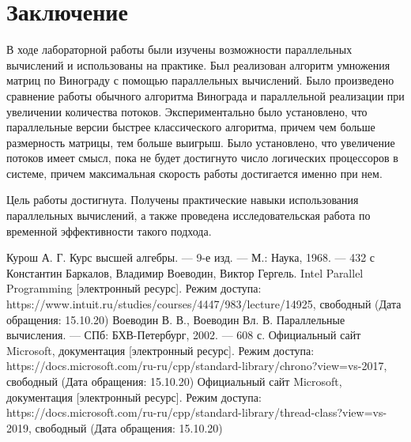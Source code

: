 \documentclass[12pt]{report}
\begin{document}
\chapter*{Заключение}
\hspace{0.6cm}В ходе лабораторной работы были изучены возможности параллельных вычислений и использованы на практике. Был реализован алгоритм умножения матриц по Винограду с помощью параллельных вычислений.
Было произведено сравнение работы обычного алгоритма Винограда и параллельной реализации при увеличении количества потоков. Экспериментально было установлено, что параллельные версии быстрее классического алгоритма, причем чем больше размерность матрицы, тем больше выигрыш. Было установлено, что увеличение потоков имеет смысл, пока не будет достигнуто число логических процессоров в системе, причем максимальная скорость работы достигается именно при нем.
 
 Цель работы достигнута. Получены практические навыки использования параллельных вычислений, а также проведена исследовательская работа по временной эффективности такого подхода.     


\begin{thebibliography}{2}
	 Курош А. Г. Курс высшей алгебры. — 9-е изд. — М.: Наука, 1968. — 432 с
	Константин Баркалов, Владимир Воеводин, Виктор Гергель. Intel Parallel Programming [электронный ресурс]. Режим доступа: https://www.intuit.ru/studies/courses/4447/983/lecture/14925, свободный (Дата обращения: 15.10.20)
	Воеводин В. В., Воеводин Вл. В. Параллельные вычисления. — СПб: БХВ-Петербург, 2002. — 608 с.
	 Официальный сайт Microsoft, документация [электронный ресурс]. Режим доступа: https://docs.microsoft.com/ru-ru/cpp/standard-library/chrono?view=vs-2017, свободный (Дата обращения: 15.10.20)
	 Официальный сайт Microsoft, документация [электронный ресурс]. Режим доступа: https://docs.microsoft.com/ru-ru/cpp/standard-library/thread-class?view=vs-2019, свободный (Дата обращения: 15.10.20)
	
\end{thebibliography}
\end{document}
